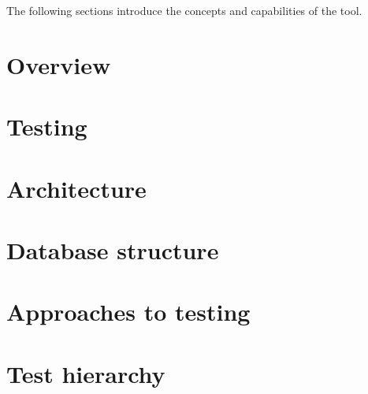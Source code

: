 %
The following sections introduce the concepts and capabilities of the tool. 


\section{Overview}


\section{Testing}


\section{Architecture}


\section{Database structure}


\section{Approaches to testing}


\section{Test hierarchy}


